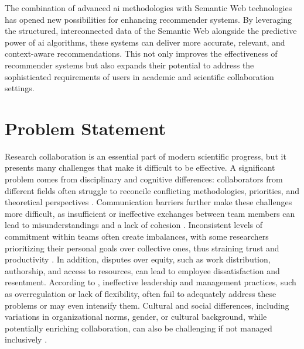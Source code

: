 The combination of advanced \gls{ai} methodologies with Semantic Web technologies has opened new possibilities for enhancing recommender systems.
By leveraging the structured, interconnected data of the Semantic Web alongside the predictive power of \gls{ai} algorithms, these systems can deliver more accurate, relevant, and context-aware recommendations.
This not only improves the effectiveness of recommender systems but also expands their potential to address the sophisticated requirements of users in academic and scientific collaboration settings.
%
\section{Problem Statement}\label{sec:problem-statement}

Research collaboration is an essential part of modern scientific progress, but it presents many challenges that make it difficult to be effective.
A significant problem comes from disciplinary and cognitive differences: collaborators from different fields often struggle to reconcile conflicting methodologies, priorities, and theoretical perspectives \cite{Bozeman2014}.
Communication barriers further make these challenges more difficult, as insufficient or ineffective exchanges between team members can lead to misunderstandings and a lack of cohesion \cite{Melin1996,Mwantimwa2023}.
Inconsistent levels of commitment within teams often create imbalances, with some researchers prioritizing their personal goals over collective ones, thus straining trust and productivity \cite{Melin1996}.
In addition, disputes over equity, such as work distribution, authorship, and access to resources, can lead to employee dissatisfaction and resentment.
According to \cite{KSubramanyam1983}, ineffective leadership and management practices, such as overregulation or lack of flexibility, often fail to adequately address these problems or may even intensify them.
Cultural and social differences, including variations in organizational norms, gender, or cultural background, while potentially enriching collaboration, can also be challenging if not managed inclusively \cite{ABRAMO20171016}.

